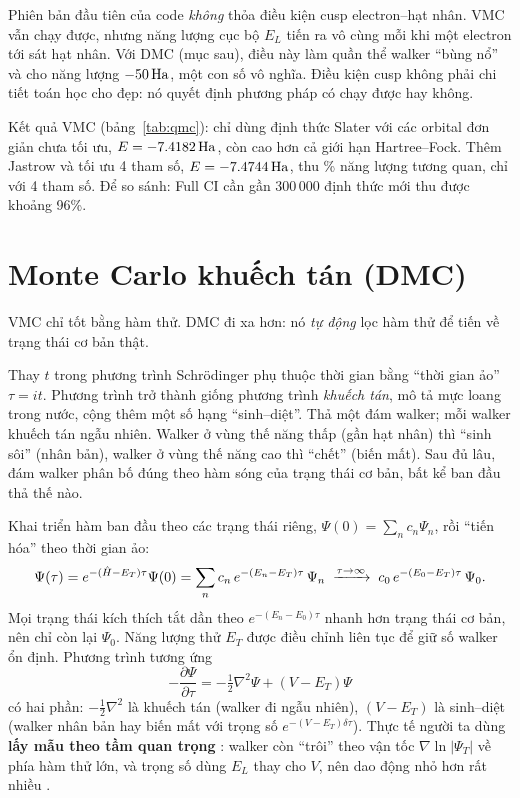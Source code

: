 \begin{hieulam}
Phiên bản đầu tiên của code \emph{không} thỏa điều kiện cusp electron--hạt nhân. VMC vẫn chạy được, nhưng năng lượng cục bộ $E_L$ tiến ra vô cùng mỗi khi một electron tới sát hạt nhân. Với DMC (mục sau), điều này làm quần thể walker ``bùng nổ'' và cho năng lượng $-50\,\mathrm{Ha}$, một con số vô nghĩa. Điều kiện cusp không phải chi tiết toán học cho đẹp: nó quyết định phương pháp có chạy được hay không.
\end{hieulam}

Kết quả VMC (bảng~\ref{tab:qmc}): chỉ dùng định thức Slater với các orbital đơn giản chưa tối ưu, $E=-7.4182\,\mathrm{Ha}$, còn cao hơn cả giới hạn Hartree--Fock. Thêm Jastrow và tối ưu 4 tham số, $E=-7.4744\,\mathrm{Ha}$, thu \PctVmc\% năng lượng tương quan, chỉ với 4 tham số. Để so sánh: Full CI cần gần 300\,000 định thức mới thu được khoảng 96\%.

\section{Monte Carlo khuếch tán (DMC)}

VMC chỉ tốt bằng hàm thử. DMC đi xa hơn: nó \emph{tự động} lọc hàm thử để tiến về trạng thái cơ bản thật.

\begin{eli5}
Thay $t$ trong phương trình Schrödinger phụ thuộc thời gian bằng ``thời gian ảo'' $\tau=it$. Phương trình trở thành giống phương trình \emph{khuếch tán}, mô tả mực loang trong nước, cộng thêm một số hạng ``sinh--diệt''. Thả một đám walker; mỗi walker khuếch tán ngẫu nhiên. Walker ở vùng thế năng thấp (gần hạt nhân) thì ``sinh sôi'' (nhân bản), walker ở vùng thế năng cao thì ``chết'' (biến mất). Sau đủ lâu, đám walker phân bố đúng theo hàm sóng của trạng thái cơ bản, bất kể ban đầu thả thế nào.
\end{eli5}

\begin{congthuc}
Khai triển hàm ban đầu theo các trạng thái riêng, $\Psi(0)=\sum_n c_n\Psi_n$, rồi ``tiến hóa'' theo thời gian ảo:
\[
\Psi(\tau)=e^{-(\hat H-E_T)\tau}\Psi(0)=\sum_n c_n\,e^{-(E_n-E_T)\tau}\,\Psi_n
\;\xrightarrow{\tau\to\infty}\;c_0\,e^{-(E_0-E_T)\tau}\,\Psi_0 .
\]
Mọi trạng thái kích thích tắt dần theo $e^{-(E_n-E_0)\tau}$ nhanh hơn trạng thái cơ bản, nên chỉ còn lại $\Psi_0$. Năng lượng thử $E_T$ được điều chỉnh liên tục để giữ số walker ổn định. Phương trình tương ứng
\[
-\frac{\partial\Psi}{\partial\tau}=-\tfrac12\nabla^2\Psi+(V-E_T)\Psi
\]
có hai phần: $-\tfrac12\nabla^2$ là khuếch tán (walker đi ngẫu nhiên), $(V-E_T)$ là sinh--diệt (walker nhân bản hay biến mất với trọng số $e^{-(V-E_T)\delta\tau}$). Thực tế người ta dùng \textbf{lấy mẫu theo tầm quan trọng} : walker còn ``trôi'' theo vận tốc $\nabla\ln|\Psi_T|$ về phía hàm thử lớn, và trọng số dùng $E_L$ thay cho $V$, nên dao động nhỏ hơn rất nhiều \cite{Reynolds1982,Umrigar1993}.
\end{congthuc}

